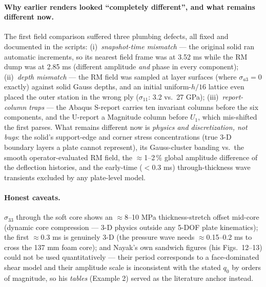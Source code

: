 \documentclass[11pt]{article}
\begin{document}
\paragraph{Why earlier renders looked ``completely different'', and what
remains different now.}
The first field comparison suffered three plumbing defects, all fixed and
documented in the scripts: (i)~\emph{snapshot-time mismatch} --- the
original solid ran automatic increments, so its nearest field frame was at
3.52 ms while the RM dump was at 2.85 ms (different amplitude \emph{and}
phase in every component); (ii)~\emph{depth mismatch} --- the RM field was
sampled at layer surfaces (where $\sigma_{a3}=0$ exactly) against solid
Gauss depths, and an initial uniform-$h/16$ lattice even placed the outer
station in the wrong ply ($\sigma_{11}$: 3.2 vs.\ 27 GPa);
(iii)~\emph{report-column traps} --- the Abaqus S-report carries ten
invariant columns before the six components, and the U-report a Magnitude
column before $U_1$, which mis-shifted the first parses.  What remains
different now is \emph{physics and discretization, not bugs}: the solid's
support-edge and corner stress concentrations (true 3-D boundary layers a
plate cannot represent), its Gauss-cluster banding vs.\ the smooth
operator-evaluated RM field, the $\approx$1--2\,\% global amplitude
difference of the deflection histories, and the early-time
($<0.3$ ms) through-thickness wave transients excluded by any
plate-level model.

\paragraph{Honest caveats.}
$\sigma_{33}$ through the soft core shows an $\approx$8--10 MPa
thickness-stretch offset mid-core (dynamic core compression --- 3-D
physics outside any 5-DOF plate kinematics); the first $\approx$0.3 ms is
genuinely 3-D (the pressure wave needs $\approx$0.15--0.2 ms to cross the
137 mm foam core); and Nayak's own sandwich figures (his Figs.~12--13)
could not be used quantitatively --- their period corresponds to a
face-dominated shear model and their amplitude scale is inconsistent with
the stated $q_0$ by orders of magnitude, so his \emph{tables} (Example 2)
served as the literature anchor instead.
\end{document}

